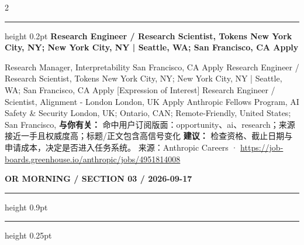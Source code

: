 \documentclass[10.5pt]{ctexart}
\begin{document}
\begin{multicols}{2}
\vspace{2mm}
\hrule height 0.2pt
\vspace{2mm}
{\large\bfseries Research Engineer / Research Scientist, Tokens New York City, NY; New York City, NY | Seattle, WA; San Francisco, CA Apply}\par
[Expression of Interest] Research Manager, Interpretability San Francisco, CA Apply Research Engineer / Research Scientist, Tokens New York City, NY; New York City, NY | Seattle, WA; San Francisco, CA Apply [Expression of Interest] Research Engineer / Scientist, Alignment - London London, UK Apply Anthropic Fellows Program, AI Safety \& Security London, UK; Ontario, CAN; Remote-Friendly, United States; San Francisco, 
\textbf{与你有关：} 命中用户订阅版面：opportunity、ai、research；来源接近一手且权威度高；标题/正文包含高信号变化
\textbf{建议：} 检查资格、截止日期与申请成本，决定是否进入任务系统。
{\footnotesize\color{ormuted} 来源：Anthropic Careers · \url{https://job-boards.greenhouse.io/anthropic/jobs/4951814008}}
\end{multicols}
\newpage
{\small\bfseries OR MORNING / SECTION 03 / 2026-09-17}
\vspace{2mm}
\hrule height 0.9pt
\vspace{1.5mm}
\hrule height 0.25pt
\vspace{4mm}
\end{document}

